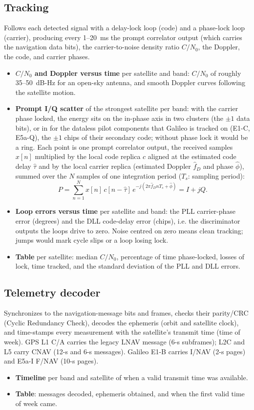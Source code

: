 \documentclass{article}
\begin{document}
\subsection{Tracking}
Follows each detected signal with a delay-lock loop (code) and a phase-lock loop (carrier), producing every 1--20~ms the prompt correlator output (which carries the navigation data bits), the carrier-to-noise density ratio $C/N_0$, the Doppler, the code, and carrier phases.
\begin{itemize}
  \item \textbf{$C/N_0$ and Doppler versus time} per satellite and band: $C/N_0$ of roughly 35--50~dB-Hz for an open-sky antenna, and smooth Doppler curves following the satellite motion.
  \item \textbf{Prompt I/Q scatter} of the strongest satellite per band: with the carrier phase locked, the energy sits on the in-phase axis in two clusters (the $\pm1$ data bits), or in for the dataless pilot components that Galileo is tracked on (E1-C, E5a-Q), the $\pm1$ chips of their secondary code; without phase lock it would be a ring. Each point is one prompt correlator output, the received samples $x[n]$ multiplied by the local code replica $c$ aligned at the estimated code delay $\hat\tau$ and by the local carrier replica (estimated Doppler $\hat f_D$ and phase $\hat\phi$), summed over the $N$ samples of one integration period ($T_s$: sampling period):
  \begin{equation}
    P = \sum_{n=1}^{N} x[n]\,c[n-\hat\tau]\,e^{-j(2\pi \hat f_D n T_s + \hat\phi)} = I + jQ.
  \end{equation}
  \item \textbf{Loop errors versus time} per satellite and band: the PLL carrier-phase error (degrees) and the DLL code-delay error (chips), i.e. the discriminator outputs the loops drive to zero. Noise centred on zero means clean tracking; jumps would mark cycle slips or a loop losing lock.
  \item \textbf{Table} per satellite: median $C/N_0$, percentage of time phase-locked, losses of lock, time tracked, and the standard deviation of the PLL and DLL errors.
\end{itemize}

\subsection{Telemetry decoder}
Synchronizes to the navigation-message bits and frames, checks their parity/CRC (Cyclic Redundancy Check), decodes the ephemeris (orbit and satellite clock), and time-stamps every measurement with the satellite's transmit time (time of week). GPS L1 C/A carries the legacy LNAV message (6-s subframes); L2C and L5 carry CNAV (12-s and 6-s messages). Galileo E1-B carries I/NAV (2-s pages) and E5a-I F/NAV (10-s pages).
\begin{itemize}
  \item \textbf{Timeline} per band and satellite of when a valid transmit time was available.
  \item \textbf{Table}: messages decoded, ephemeris obtained, and when the first valid time of week came.
\end{itemize}
\end{document}
